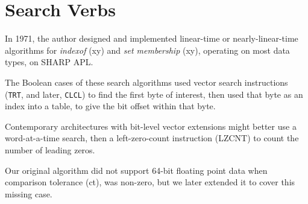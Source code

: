 \section{Search Verbs}
\label{searchverbs}

In 1971, the author designed and implemented 
linear-time or nearly-linear-time algorithms 
for {\em indexof} ({\apl x\qiota\0y}) 
and {\em set membership} ({\apl x\qeps\0y}), 
operating on most data types, on 
SHARP APL.\cite{RBernecky:iota}

The Boolean cases of these search algorithms used vector search
instructions ({\tt TRT}, and later, {\tt CLCL}) to find the first
byte of interest, then used that byte as an index into a table,
to give the bit offset within that byte.


Contemporary architectures with bit-level vector extensions
might better use a word-at-a-time search, then a left-zero-count
instruction (LZCNT) to count the 
number of leading zeros.~\cite{INTEL:avx,AMD:instructions}

Our original algorithm did not support 64-bit floating point 
data when comparison tolerance ({\apl \qQuad\0ct}), was non-zero, but
we later extended it to cover this missing case.

